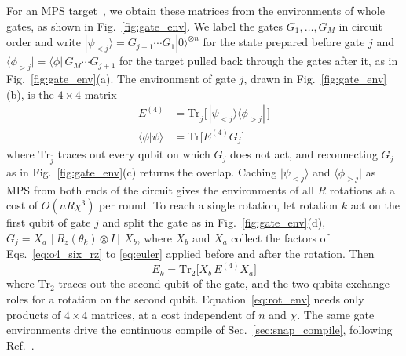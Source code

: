 For an MPS target~\cite{Schollwock2011}, we obtain these matrices from the environments of whole gates, as shown in Fig.~\ref{fig:gate_env}. We label the gates $G_1, \dots, G_M$ in circuit order and write $|\psi_{<j}\rangle = G_{j-1} \cdots G_1 |0\rangle^{\otimes n}$ for the state prepared before gate $j$ and $\langle \phi_{>j}| = \langle \phi |\, G_M \cdots G_{j+1}$ for the target pulled back through the gates after it, as in Fig.~\ref{fig:gate_env}(a). The environment of gate $j$, drawn in Fig.~\ref{fig:gate_env}(b), is the $4 \times 4$ matrix
\begin{equation}
\begin{split}
E^{(4)} &= \mathrm{Tr}_{\bar{j}}\big[\, |\psi_{<j}\rangle \langle \phi_{>j}|\, \big] \\
\langle \phi | \psi \rangle &= \mathrm{Tr}\big[ E^{(4)} G_j \big]
\end{split}
\label{eq:gate_env}
\end{equation}
where $\mathrm{Tr}_{\bar{j}}$ traces out every qubit on which $G_j$ does not act, and reconnecting $G_j$ as in Fig.~\ref{fig:gate_env}(c) returns the overlap. Caching $|\psi_{<j}\rangle$ and $\langle \phi_{>j}|$ as MPS from both ends of the circuit gives the environments of all $R$ rotations at a cost of $O(nR\chi^{3})$ per round. To reach a single rotation, let rotation $k$ act on the first qubit of gate $j$ and split the gate as in Fig.~\ref{fig:gate_env}(d), $G_j = X_a\, [R_z(\theta_k) \otimes I]\, X_b$, where $X_b$ and $X_a$ collect the factors of Eqs.~\eqref{eq:o4_six_rz} to \eqref{eq:euler} applied before and after the rotation. Then
\begin{equation}
E_k = \mathrm{Tr}_2\big[ X_b\, E^{(4)} X_a \big]
\label{eq:rot_env}
\end{equation}
where $\mathrm{Tr}_2$ traces out the second qubit of the gate, and the two qubits exchange roles for a rotation on the second qubit. Equation~\eqref{eq:rot_env} needs only products of $4 \times 4$ matrices, at a cost independent of $n$ and $\chi$. The same gate environments drive the continuous compile of Sec.~\ref{sec:snap_compile}, following Ref.~\cite{EvenblyVidal2009}.

